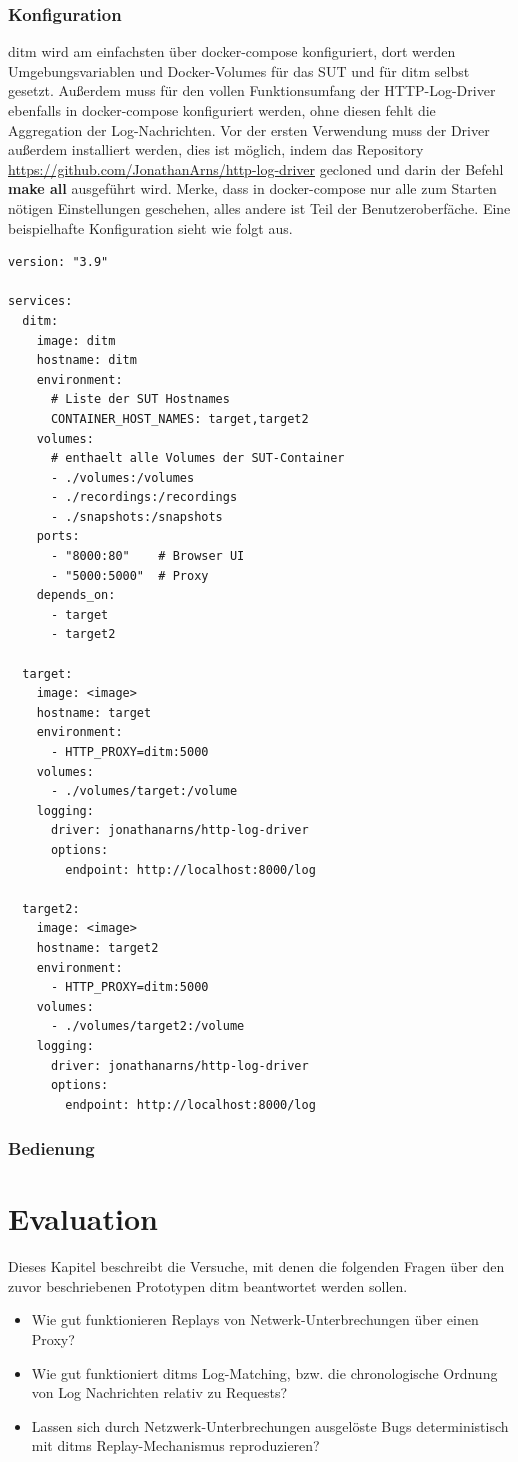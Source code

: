 \documentclass[12pt,a4paper]{report}
\begin{document}
\subsection{Konfiguration}
ditm wird am einfachsten über docker-compose konfiguriert, dort werden Umgebungsvariablen und Docker-Volumes für das SUT und für
ditm selbst gesetzt. Außerdem muss für den vollen Funktionsumfang der HTTP-Log-Driver ebenfalls in docker-compose konfiguriert
werden, ohne diesen fehlt die Aggregation der Log-Nachrichten. Vor der ersten Verwendung muss der Driver außerdem installiert
werden, dies ist möglich, indem das Repository \url{https://github.com/JonathanArns/http-log-driver} gecloned und darin der Befehl
\textbf{make all} ausgeführt wird. Merke, dass in docker-compose nur alle zum Starten nötigen Einstellungen geschehen, alles andere ist Teil
der Benutzeroberfäche. Eine beispielhafte Konfiguration sieht wie folgt aus.
\begin{lstlisting}
version: "3.9"

services:
  ditm:
    image: ditm
    hostname: ditm
    environment:
      # Liste der SUT Hostnames
      CONTAINER_HOST_NAMES: target,target2  
    volumes:
      # enthaelt alle Volumes der SUT-Container
      - ./volumes:/volumes  
      - ./recordings:/recordings
      - ./snapshots:/snapshots
    ports:
      - "8000:80"    # Browser UI
      - "5000:5000"  # Proxy
    depends_on:
      - target
      - target2
  
  target:
    image: <image>
    hostname: target
    environment: 
      - HTTP_PROXY=ditm:5000
    volumes:
      - ./volumes/target:/volume
    logging:
      driver: jonathanarns/http-log-driver
      options:
        endpoint: http://localhost:8000/log

  target2:
    image: <image>
    hostname: target2
    environment: 
      - HTTP_PROXY=ditm:5000
    volumes:
      - ./volumes/target2:/volume
    logging:
      driver: jonathanarns/http-log-driver
      options:
        endpoint: http://localhost:8000/log
\end{lstlisting}

\subsection{Bedienung}

\chapter{Evaluation}
Dieses Kapitel beschreibt die Versuche, mit denen die folgenden Fragen über den zuvor beschriebenen Prototypen ditm beantwortet
werden sollen.
\begin{itemize}
	\item Wie gut funktionieren Replays von Netwerk-Unterbrechungen über einen Proxy?
	\item Wie gut funktioniert ditms Log-Matching, bzw. die chronologische Ordnung von Log Nachrichten relativ zu Requests?
	\item Lassen sich durch Netzwerk-Unterbrechungen ausgelöste Bugs deterministisch mit ditms Replay-Mechanismus reproduzieren?
\end{itemize}
\end{document}
